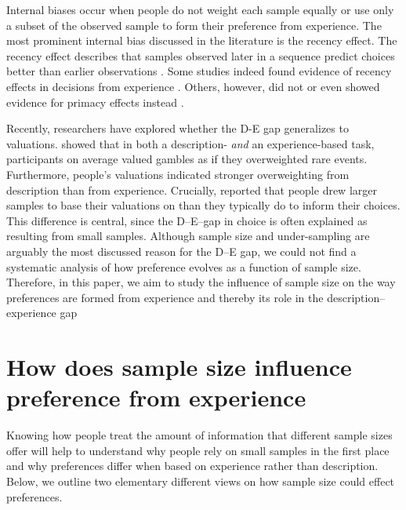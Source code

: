 Internal biases occur when people do not weight each sample equally or use only a subset of the observed sample to form their preference from experience. The most prominent internal bias discussed in the literature is the recency effect. The recency effect describes that samples observed later in a sequence predict choices better than earlier observations \citep[e.g.,][]{Hertwig2004,Rakow2008}. Some studies indeed found evidence of recency effects in decisions from experience \citep[e.g.,][]{Hertwig2004,Rakow2008}. Others, however, did not \citep[e.g.,][]{Hau2008,Ungemach2009} or even showed evidence for primacy effects instead \citep[e.g.,][]{Camilleri2011}. 

Recently, researchers have explored whether the D-E gap generalizes to valuations. \cite{Golan2014} showed that in both a description- \textit{and} an experience-based task, participants on average valued gambles as if they overweighted rare events. Furthermore, people's valuations indicated stronger overweighting from description than from experience. Crucially, \cite{Golan2014} reported that people drew larger samples to base their valuations on than they typically do to inform their choices. This difference is central, since the D--E--gap in choice is often explained as resulting from small samples. Although sample size and under-sampling are arguably the most discussed reason for the D--E gap, we could not find a systematic analysis of how preference evolves as a function of sample size. 
Therefore, in this paper, we aim to study the influence of sample size on the way preferences are formed from experience and thereby its role in the description--experience gap


\section{How does sample size influence preference from experience}

Knowing how people treat the amount of information that different sample sizes offer will help to understand why people rely on small samples in the first place and why preferences differ when based on experience rather than description.
Below, we outline two elementary different views on how sample size could effect preferences.

